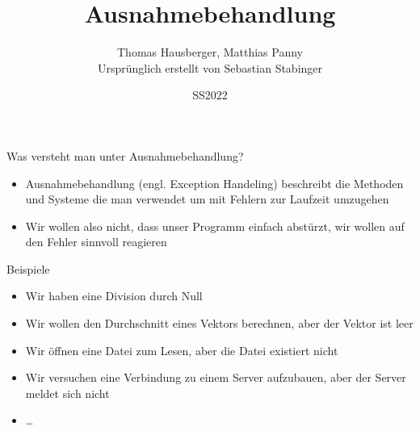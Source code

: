 \documentclass[presentation]{beamer}
\author{Thomas Hausberger, Matthias Panny \\ Ursprünglich erstellt von Sebastian Stabinger}
\date{SS2022}
\title{Ausnahmebehandlung}
\begin{document}
\maketitle

\begin{frame}[label={sec:org6ff98b5}]{Was versteht man unter Ausnahmebehandlung?}
\begin{itemize}
\item Ausnahmebehandlung (engl. Exception Handeling) beschreibt die
Methoden und Systeme die man verwendet um mit Fehlern \alert{zur Laufzeit}
umzugehen
\item Wir wollen also nicht, dass unser Programm einfach abstürzt, wir
\alert{wollen auf den Fehler sinnvoll reagieren}
\end{itemize}
\begin{block}{Beispiele}
\begin{itemize}
\item Wir haben eine Division durch Null
\item Wir wollen den Durchschnitt eines Vektors berechnen, aber der Vektor
ist leer
\item Wir öffnen eine Datei zum Lesen, aber die Datei existiert nicht
\item Wir versuchen eine Verbindung zu einem Server aufzubauen, aber der
Server meldet sich nicht
\item \ldots{}
\end{itemize}
\end{block}
\end{frame}
\end{document}
